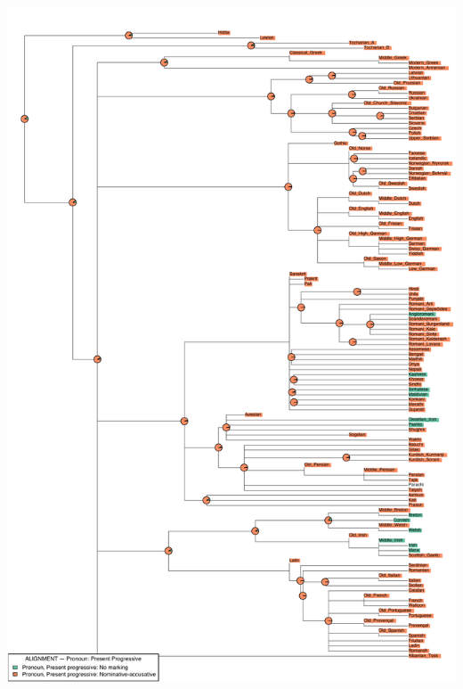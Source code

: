 \includegraphics[width=.9\linewidth]{supp-graphics/ALIGNMENTPronounPresentProgressivePPROGOSoALIGNMENTPronounPresentProgressivePPROGAOALIGNMENTPronounPresentProgressivePPROGASaALIGNMENTPronounPresentProgressivePPROGSaSo.pdf}

